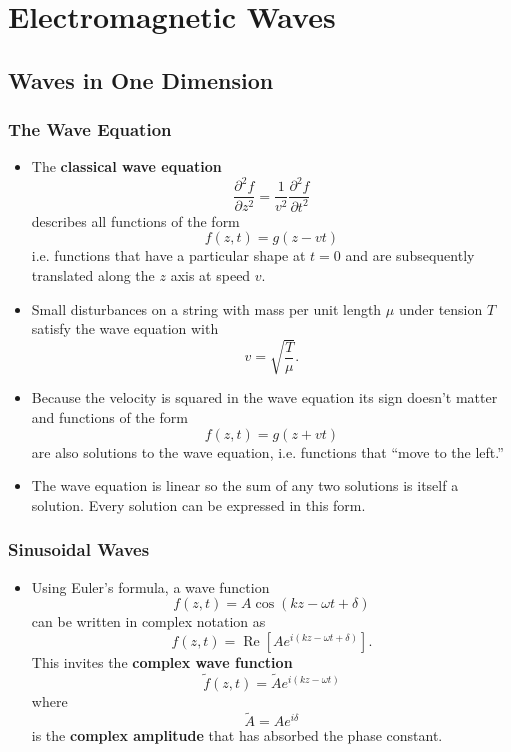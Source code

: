 \documentclass{article}
\renewcommand{\Re}{\operatorname{Re}}
\begin{document}
\section{Electromagnetic Waves}

\subsection{Waves in One Dimension}

\subsubsection{The Wave Equation}

\begin{itemize}
  \item The \textbf{classical wave equation} \[\frac{\partial^2 f}{\partial z^2} = \frac{1}{v^2} \frac{\partial^2 f}{\partial t^2}\] describes all functions of the form \[f(z, t) = g(z - v t)\] i.e. functions that have a particular shape at $t = 0$ and are subsequently translated along the $z$ axis at speed $v$.

  \item Small disturbances on a string with mass per unit length $\mu$ under tension $T$ satisfy the wave equation with \[v = \sqrt{\frac{T}{\mu}}.\]

  \item Because the velocity is squared in the wave equation its sign doesn't matter and functions of the form \[f(z, t) = g(z + v t)\] are also solutions to the wave equation, i.e. functions that ``move to the left.''

  \item The wave equation is linear so the sum of any two solutions is itself a solution. Every solution can be expressed in this form.
\end{itemize}

\subsubsection{Sinusoidal Waves}

\begin{itemize}
  \item Using Euler's formula, a wave function \[f(z, t) = A \cos (k z - \omega t + \delta)\] can be written in complex notation as \[f(z, t) = \Re \left[ A e^{i (k z - \omega t + \delta)} \right].\] This invites the \textbf{complex wave function} \[\tilde{f}(z, t) = \tilde{A} e^{i (k z - \omega t)}\] where \[\tilde{A} = A e^{i \delta}\] is the \textbf{complex amplitude} that has absorbed the phase constant.
\end{itemize}
\end{document}
